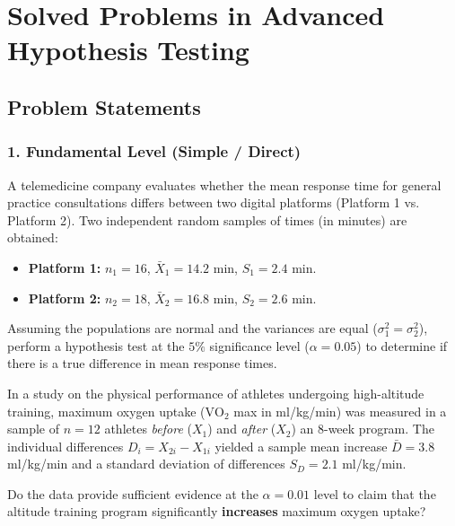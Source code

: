 \section{Solved Problems in Advanced Hypothesis Testing}

\subsection{Problem Statements}

\subsubsection*{1. Fundamental Level (Simple / Direct)}

\begin{problema}
	\label{prob:doc_dos_medias_iguales}
	A telemedicine company evaluates whether the mean response time for general practice consultations differs between two digital platforms (Platform 1 vs. Platform 2). Two independent random samples of times (in minutes) are obtained:
	\begin{itemize}
		\item \textbf{Platform 1:} $n_1 = 16$, $\bar{X}_1 = 14.2$ min, $S_1 = 2.4$ min.
		\item \textbf{Platform 2:} $n_2 = 18$, $\bar{X}_2 = 16.8$ min, $S_2 = 2.6$ min.
	\end{itemize}
	Assuming the populations are normal and the variances are equal ($\sigma_1^2 = \sigma_2^2$), perform a hypothesis test at the $5\%$ significance level ($\alpha = 0.05$) to determine if there is a true difference in mean response times.
\end{problema}

\begin{problema}
	\label{prob:doc_pareadas}
	In a study on the physical performance of athletes undergoing high-altitude training, maximum oxygen uptake ($\text{VO}_2$ max in ml/kg/min) was measured in a sample of $n = 12$ athletes \emph{before} ($X_1$) and \emph{after} ($X_2$) an 8-week program. The individual differences $D_i = X_{2i} - X_{1i}$ yielded a sample mean increase $\bar{D} = 3.8$ ml/kg/min and a standard deviation of differences $S_D = 2.1$ ml/kg/min.
	
	Do the data provide sufficient evidence at the $\alpha = 0.01$ level to claim that the altitude training program significantly \textbf{increases} maximum oxygen uptake?
\end{problema}

